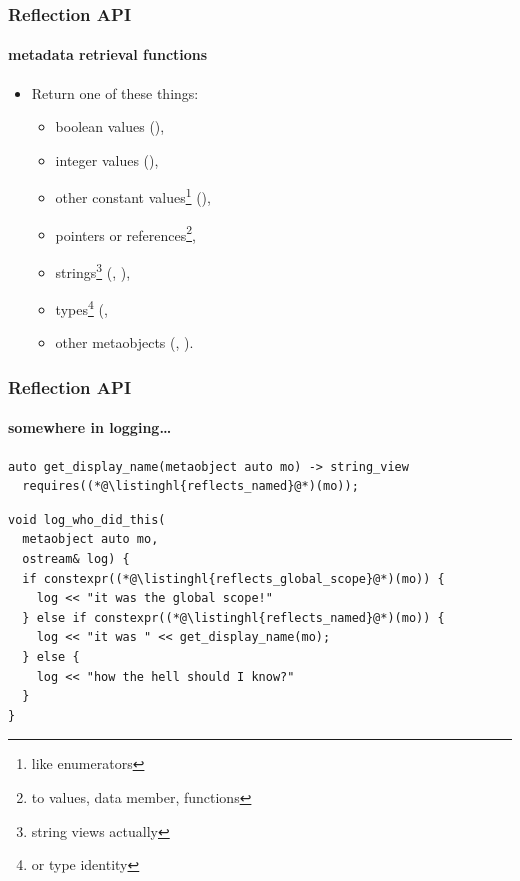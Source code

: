 \documentclass[compress,table,xcolor=table]{beamer}
\begin{document}
\begin{frame}
  \frametitle{Reflection API}
  \framesubtitle{metadata retrieval functions}
  \larger
  \begin{itemize}
  \item Return one of these things:
    \begin{itemize}
      \smaller
      \item boolean values (),
      \item integer values (),
      \item other constant values\footnote{like enumerators} (),
      \item pointers or references\footnote{to values, data member, functions},
      \item strings\footnote{string views actually} (,
        ),
      \item types\footnote{or type identity} (,
      \item other metaobjects (, ).
    \end{itemize}
  \end{itemize}
\end{frame}
\begin{frame}[fragile]
  \frametitle{Reflection API}
  \framesubtitle{somewhere in logging\ldots}
  \begin{lstlisting}[language=c++2x,basicstyle=\footnotesize\ttfamily]
auto get_display_name(metaobject auto mo) -> string_view
  requires((*@\listinghl{reflects_named}@*)(mo));
  \end{lstlisting}
  \begin{lstlisting}[language=c++2x,basicstyle=\footnotesize\ttfamily]
void log_who_did_this(
  metaobject auto mo,
  ostream& log) {
  if constexpr((*@\listinghl{reflects_global_scope}@*)(mo)) {
    log << "it was the global scope!"
  } else if constexpr((*@\listinghl{reflects_named}@*)(mo)) {
    log << "it was " << get_display_name(mo);
  } else {
    log << "how the hell should I know?"
  }
}
  \end{lstlisting}
\end{frame}
\end{document}
